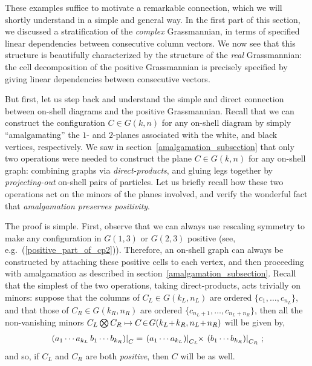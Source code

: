 \documentclass[12pt,hyperref,compress]{JHEP3}
\newcommand{\eq}[1]{\begin{equation}#1\end{equation}}
\newcommand{\pl}{\hspace{0.5pt}\text{{\small+}}\hspace{-0.5pt}}
\begin{document}
{These examples suffice to motivate a remarkable connection, which we will shortly understand in a simple and general way. In the first part of this section, we discussed a stratification of the {\it complex} Grassmannian, in terms of specified linear dependencies between consecutive column vectors. We now see that this structure is beautifully characterized by the structure of the {\it real} Grassmannian: the cell decomposition of the positive Grassmannian is precisely specified by giving linear dependencies between consecutive vectors.

But first, let us step back and understand the simple and direct connection between on-shell diagrams and the positive Grassmannian. Recall that we can construct the configuration $C\!\in\!G(k,n)$ for any on-shell diagram by simply ``amalgamating'' the $1$- and $2$-planes associated with the white, and black vertices, respectively. We saw in \mbox{section \ref{amalgamation_subsection}} that only two operations were needed to construct the plane $C\!\in\!G(k,n)$ for any  on-shell graph: combining graphs via {\it direct-products}, and gluing legs together by {\it projecting-out} on-shell pairs of particles. Let us briefly recall how these two operations act on the minors of the planes involved, and verify the wonderful fact that {\it amalgamation preserves positivity}.

The proof is simple. First, observe that we can always use rescaling symmetry to make any configuration in $G(1,3)$ or $G(2,3)$ positive (see, e.g.\ (\ref{positive_part_of_cp2})). Therefore, an on-shell graph can always be constructed by attaching these positive cells to each vertex, and then proceeding with amalgamation as described in \mbox{section \ref{amalgamation_subsection}}. Recall that the simplest of the two operations, taking direct-products, acts trivially on minors: suppose that the columns of $C_L\!\in\!G(k_L,n_L)$  are ordered $\{c_1,\ldots,c_{n_L}\}$, and that those of $C_R\!\in\!G(k_R,n_R)$ are ordered $\{c_{n_L+1},\ldots,c_{n_L+n_R}\}$, then all  the non-vanishing minors $C_L\bigotimes C_R\mapsto C\!\in\!G(k_L\pl\,k_R,n_L\pl\,n_R)$ will be given by,
\vspace{-.2cm}\eq{\left.(a_1\cdots a_{k_L}\,b_1\cdots b_{k_R})\right|_{C}=\left.(a_1\cdots a_{k_L})\right|_{C_L}\!\!\times\left.(b_1\cdots b_{k_R})\right|_{C_R}\,;\vspace{-.2cm}}
and so, if $C_L$ and $C_R$ are both {\it positive}, then $C$ will be as well.

}
\end{document}
